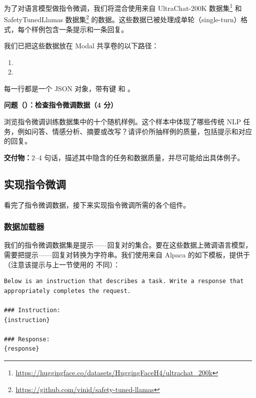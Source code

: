 为了对语言模型做指令微调，我们将混合使用来自 UltraChat-200K 数据集\footnote{\url{https://huggingface.co/datasets/HuggingFaceH4/ultrachat_200k}} 和 SafetyTunedLlamas 数据集\footnote{\url{https://github.com/vinid/safety-tuned-llamas}} 的数据。这些数据已被处理成单轮（single-turn）格式，每个样例包含一条提示和一条回复。

我们已把这些数据放在 Modal 共享卷的以下路径：
\begin{enumerate}
  \item {}
  \item {}
\end{enumerate}

每一行都是一个 JSON 对象，带有键  和 。

\medskip
\noindent\textbf{问题（）：检查指令微调数据（4 分）}
\medskip

浏览指令微调训练数据集中的十个随机样例。这个样本中体现了哪些传统 NLP 任务，例如问答、情感分析、摘要或改写？请评价所抽样例的质量，包括提示和对应的回复。

\textbf{交付物：}2--4 句话，描述其中隐含的任务和数据质量，并尽可能给出具体例子。

\subsection{实现指令微调}

看完了指令微调数据，接下来实现指令微调所需的各个组件。

\subsubsection{数据加载器}

我们的指令微调数据集是提示——回复对的集合。要在这些数据上微调语言模型，需要把提示——回复对转换为字符串。我们使用来自 Alpaca 的如下模板，提供于 （注意该提示与上一节使用的  不同）：

\begin{lstlisting}
Below is an instruction that describes a task. Write a response that appropriately completes the request.

### Instruction:
{instruction}

### Response:
{response}
\end{lstlisting}

